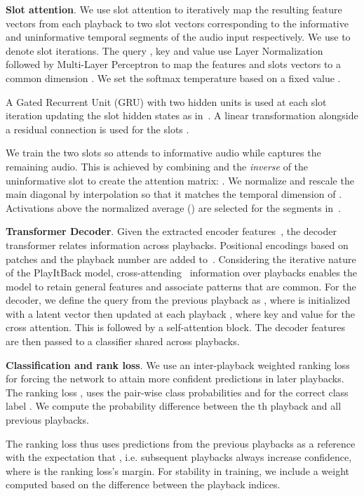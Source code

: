 \documentclass{article}
\begin{document}
\noindent
\textbf{Slot attention}. We use slot attention \cite{locatello2020object}  to iteratively  map the resulting feature vectors  from each playback to two slot vectors  corresponding to the informative  and uninformative  temporal segments of the audio input respectively. We use  to denote slot iterations. The query , key  and value  use Layer Normalization  followed by Multi-Layer Perceptron  to map the features  and slots  vectors to a common dimension . We set the softmax temperature based on a fixed value . 


\noindent
A Gated Recurrent Unit (GRU) with two hidden units is used at each slot iteration updating the slot hidden states  as in~\cite{locatello2020object}. A linear transformation alongside a residual connection is used for the slots . 

We train the two slots so  attends to informative audio while  captures the remaining audio.
This is achieved by combining  and the \emph{inverse} of the uninformative slot  to create the attention matrix: . We normalize and rescale the main diagonal  by interpolation so that it matches the temporal dimension of . Activations above the normalized average () are selected for the segments in~.



\noindent
\textbf{Transformer Decoder}. Given the extracted encoder features~, the decoder transformer  relates information across playbacks. Positional encodings based on patches and the playback number are added to~. Considering the iterative nature of the PlayItBack model, cross-attending~\cite{jaegle2021perceiver} information over playbacks enables the model to retain general features and associate patterns that are common. For the decoder, 
we define the query from the previous playback as , where  is initialized with a latent vector then updated at each playback , where  
key  and value  for the cross attention. This is followed by a self-attention block. The decoder features are then passed to a classifier shared across playbacks.



\noindent
\textbf{Classification and rank loss}. We use an inter-playback weighted ranking loss  for forcing the network to attain more confident predictions in later playbacks. The ranking loss , uses the pair-wise class probabilities  and  for the correct class label . We compute the probability difference  between the th playback and all previous playbacks.

The ranking loss thus uses predictions from the previous playbacks as a reference with the expectation that , i.e. subsequent playbacks always increase confidence, where  is the ranking loss's margin. For stability in training, we include a weight  computed based on the difference between the playback indices. 
\end{document}
